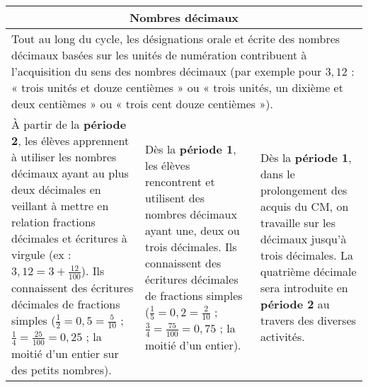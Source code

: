 \documentclass[11pt]{article}
\newcommand{\souscategorie}[1]{\hline\multicolumn{3}{|c|}{\color{or}\sffamily\phantom{É}#1\phantom{É}\rmfamily}\\\hline}
\newcommand{\note}[1]{\hline\multicolumn{3}{|p{18.6cm}|}{#1} \\ \hline}
\newenvironment{programme}
{
    \setlength{\arrayrulewidth}{0.5pt}
    \arrayrulecolor{or}
    \begin{center}
    \begin{tabular}{|p{6.4cm}|p{6.4cm}|p{6.4cm}|}
}
{
    \hline
    \end{tabular}
    \end{center}
}
\begin{document}
\begin{programme}
    \souscategorie{Nombres décimaux} 
    \note{Tout au long du cycle, les désignations orale et écrite des nombres décimaux basées sur les unités de numération contribuent à l’acquisition du sens des nombres décimaux (par exemple pour $3,12$ : « trois unités et douze centièmes » ou « trois unités, un dixième et deux centièmes » ou « trois cent douze centièmes »).} 
    À partir de la \textbf{période 2}, les élèves apprennent à utiliser les nombres décimaux ayant au plus deux décimales en veillant à mettre en relation fractions décimales et écritures à virgule (ex : $3,12 = 3 + \frac{12}{100}$). Ils connaissent des écritures décimales de fractions simples ($\frac{1}{2} = 0,5 = \frac{5}{10}$ ; $\frac{1}{4} = \frac{25}{100} = 0,25$ ; la moitié d'un entier sur des petits nombres). & Dès la \textbf{période 1}, les élèves rencontrent et utilisent des nombres décimaux ayant une, deux ou trois décimales. Ils connaissent des écritures décimales de fractions simples ($\frac{1}{5} = 0,2 = \frac{2}{10}$ ; $\frac{3}{4} = \frac{75}{100} = 0,75$ ; la moitié d’un entier). & Dès la \textbf{période 1}, dans le prolongement des acquis du CM, on travaille sur les décimaux jusqu’à trois décimales. La quatrième décimale sera introduite en \textbf{période 2} au travers des diverses activités.\\
\end{programme}
\end{document}
